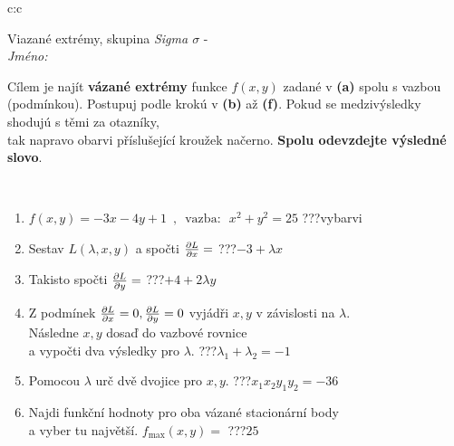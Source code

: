 \documentclass[10pt]{report}
\begin{document}
\begin{tabular}{c:c}
\begin{minipage}[c][104.5mm][t]{0.5\linewidth}
\begin{center}
\vspace{7mm}
{\huge Viazané extrémy, skupina \textit{Sigma $\sigma$} -}\\[5mm]
\textit{Jméno:}\phantom{xxxxxxxxxxxxxxxxxxxxxxxxxxxxxxxxxxxxxxxxxxxxxxxxxxxxxxxxxxxxxxxxx}\\[5mm]
\begin{minipage}{0.95\linewidth}
\begin{center}
Cílem je najít \textbf{vázané extrémy} funkce $f(x,y)$ zadané v \textbf{(a)} spolu s vazbou (podmínkou). Postupuj podle krokú v \textbf{(b)} až \textbf{(f)}. Pokud se medzivýsledky shodujú s těmi za otazníky,\\tak napravo obarvi příslušející kroužek načerno. \textbf{Spolu odevzdejte výsledné slovo}.
\end{center}
\end{minipage}
\\[1mm]
\begin{minipage}{0.79\linewidth}
\begin{center}
\begin{varwidth}{\linewidth}
\begin{enumerate}
\normalsize
\item $f(x,y)=-3x-4y+1 \enspace , \enspace \mathrm{vazba:} \enspace x^2+y^2=25$\quad \dotfill\; ???\;\dotfill \quad vybarvi
\item Sestav $L(\lambda,x,y)$ a spočti $\pdv{L}{x}=$\quad \dotfill\; ???\;\dotfill \quad $-3+\lambda x$
\item Takisto spočti $\pdv{L}{y}=$\quad \dotfill\; ???\;\dotfill \quad $+4+2\lambda y$
\item Z podmínek $\pdv{L}{x}=0 , \pdv{L}{y}=0$ vyjádři $x,y$ v závislosti na $\lambda$.\\ \phantom{xxxxxx}Následne $x,y$ dosaď do vazbové rovnice\\ \phantom{xxxxxx}a vypočti dva výsledky pro $\lambda$.\quad \dotfill\; ???\;\dotfill \quad $\lambda_1+\lambda_2=-1$
\item Pomocou $\lambda$ urč dvě dvojice pro $x,y$.\quad \dotfill\; ???\;\dotfill \quad $x_1 x_2 y_1 y_2=-36$
\item Najdi funkční hodnoty pro oba vázané stacionární body\\ \phantom{xxxxxx}a vyber tu najvětší. $f_{\text{max}}(x,y)=$\quad \dotfill\; ???\;\dotfill \quad $25$

\end{enumerate}
\end{varwidth}
\end{center}
\end{minipage}
\end{center}
\end{minipage}
\end{tabular}
\end{document}
